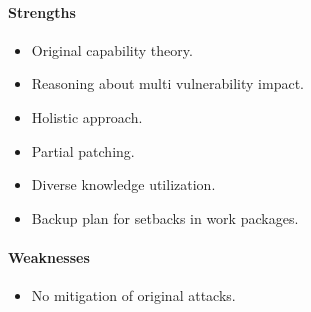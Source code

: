 \paragraph{Strengths}
\begin{itemize}
  \item Original capability theory.
  \item Reasoning about multi vulnerability impact.
  \item Holistic approach.
  \item Partial patching.
  \item Diverse knowledge utilization.
  \item Backup plan for setbacks in work packages.
\end{itemize}

\paragraph{Weaknesses}
\begin{itemize}
  \item No mitigation of original attacks.
\end{itemize}
